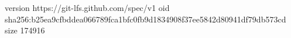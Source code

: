 version https://git-lfs.github.com/spec/v1
oid sha256:b25ea9cfbddea066789fca1bfc0fb9d1834908f37ee5842d80941df79db573cd
size 174916
